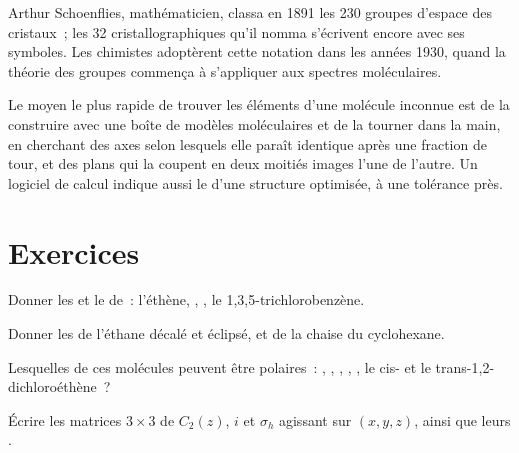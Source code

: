 \begin{history}
Arthur Schoenflies, mathématicien, classa en 1891 les 230 groupes
d'espace des cristaux~; les 32  cristallographiques
qu'il nomma s'écrivent encore avec ses symboles. Les chimistes adoptèrent
cette notation dans les années 1930, quand la théorie des groupes
commença à s'appliquer aux spectres moléculaires.
\end{history}

\begin{inthelab}
Le moyen le plus rapide de trouver les éléments d'une molécule
inconnue est de la construire avec une boîte de modèles moléculaires et
de la tourner dans la main, en cherchant des axes selon lesquels elle
paraît identique après une fraction de tour, et des plans qui la coupent
en deux moitiés images l'une de l'autre. Un logiciel de calcul indique
aussi le  d'une structure optimisée, à une tolérance
près.
\end{inthelab}

\section{Exercices}

\begin{exercise}[$\star$]\label{exo:b3:point-groups:1}
Donner les  et le  de~: l'éthène,
, , le 1,3,5-trichlorobenzène.
\end{exercise}

\begin{exercise}[$\star$]\label{exo:b3:point-groups:2}
Donner les  de l'éthane décalé et éclipsé, et de la
chaise du cyclohexane.
\end{exercise}

\begin{exercise}[$\star$]\label{exo:b3:point-groups:3}
Lesquelles de ces molécules peuvent être polaires~: , ,
, , , le cis- et le trans-1,2-dichloroéthène~?
\end{exercise}

\begin{exercise}[$\star$]\label{exo:b3:point-groups:4}
Écrire les matrices $3\times3$ de $C_2(z)$, $i$ et $\sigma_h$ agissant sur
$(x, y, z)$, ainsi que leurs .
\end{exercise}

